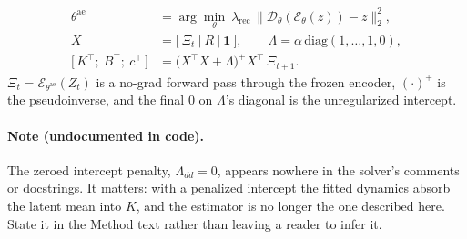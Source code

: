 \begin{align}
  \theta^{\mathrm{ae}} &= \arg\min_{\theta}\ \lambda_{\mathrm{rec}}\,
    \bigl\lVert \mathcal{D}_\theta(\mathcal{E}_\theta(z)) - z \bigr\rVert_2^2,
  \label{eq:stage-one}\\[4pt]
  X &= \bigl[\ \Xi_t \ \big|\ R \ \big|\ \mathbf{1}\ \bigr], \qquad
  \Lambda = \alpha\,\mathrm{diag}(1,\dots,1,0),
  \label{eq:stage-two-design}\\[4pt]
  \bigl[\,K^\top;\ B^\top;\ c^\top\,\bigr]
    &= \bigl(X^\top X + \Lambda\bigr)^{+} X^\top\, \Xi_{t+1}.
  \label{eq:stage-two-solve}
\end{align}
%
\noindent $\Xi_t = \mathcal{E}_{\theta^{\mathrm{ae}}}(Z_t)$ is a no-grad forward pass through
the frozen encoder, $(\cdot)^{+}$ is the pseudoinverse, and the final $0$ on $\Lambda$'s
diagonal is the unregularized intercept.

\paragraph{Note (undocumented in code).}
The zeroed intercept penalty, $\Lambda_{dd}=0$, appears nowhere in the solver's comments or
docstrings. It matters: with a penalized intercept the fitted dynamics absorb the latent mean
into $K$, and the estimator is no longer the one described here. State it in the Method text
rather than leaving a reader to infer it.

